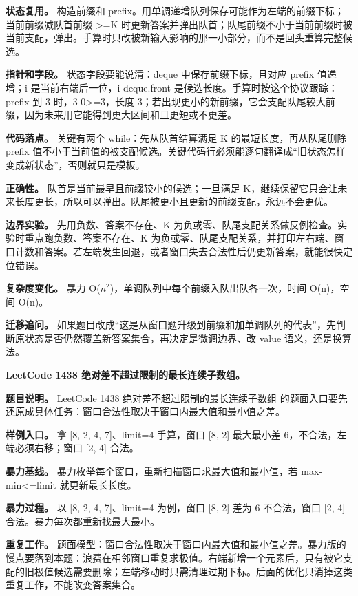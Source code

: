 \textbf{状态复用。} 构造前缀和 prefix。用单调递增队列保存可能作为左端的前缀下标；当前前缀减队首前缀 >=K 时更新答案并弹出队首；队尾前缀不小于当前前缀时被当前支配，弹出。手算时只改被新输入影响的那一小部分，而不是回头重算完整候选。

\textbf{指针和字段。} 状态字段要能说清：deque 中保存前缀下标，且对应 prefix 值递增；i 是当前右端后一位，i-deque.front 是候选长度。手算时按这个协议跟踪：prefix 到 3 时，3-0>=3，长度 3；若出现更小的新前缀，它会支配队尾较大前缀，因为未来用它能得到更大区间和且更短或不更差。

\textbf{代码落点。} 关键有两个 while：先从队首结算满足 K 的最短长度，再从队尾删除 prefix 值不小于当前值的被支配候选。关键代码行必须能逐句翻译成“旧状态怎样变成新状态”，否则就只是模板。

\textbf{正确性。} 队首是当前最早且前缀较小的候选；一旦满足 K，继续保留它只会让未来长度更长，所以可以弹出。队尾被更小且更新的前缀支配，永远不会更优。

\textbf{边界实验。} 先用负数、答案不存在、K 为负或零、队尾支配关系做反例检查。实验时重点跑负数、答案不存在、K 为负或零、队尾支配关系，并打印左右端、窗口计数和答案。若左端发生回退，或者窗口失去合法性后仍更新答案，就能很快定位错误。

\textbf{复杂度变化。} 暴力 O(\ensuremath{n^{2}})，单调队列中每个前缀入队出队各一次，时间 O(n)，空间 O(n)。

\textbf{迁移追问。} 如果题目改成“这是从窗口题升级到前缀和加单调队列的代表”，先判断原状态是否仍然覆盖新答案集合，再决定是微调边界、改 value 语义，还是换算法。

\noindent\textbf{LeetCode 1438 绝对差不超过限制的最长连续子数组。}

\textbf{题目说明。} LeetCode 1438 绝对差不超过限制的最长连续子数组 的题面入口要先还原成具体任务：窗口合法性取决于窗口内最大值和最小值之差。

\textbf{样例入口。} 拿 [8, 2, 4, 7]、limit=4 手算，窗口 [8, 2] 最大最小差 6，不合法，左端必须右移；窗口 [2, 4] 合法。

\textbf{暴力基线。} 暴力枚举每个窗口，重新扫描窗口求最大值和最小值，若 max-min<=limit 就更新最长长度。

\textbf{暴力过程。} 以 [8, 2, 4, 7]、limit=4 为例，窗口 [8, 2] 差为 6 不合法，窗口 [2, 4] 合法。暴力每次都重新找最大最小。

\textbf{重复工作。} 题面模型：窗口合法性取决于窗口内最大值和最小值之差。暴力版的慢点要落到本题：浪费在相邻窗口重复求极值。右端新增一个元素后，只有被它支配的旧极值候选需要删除；左端移动时只需清理过期下标。后面的优化只消掉这类重复工作，不能改变答案集合。

